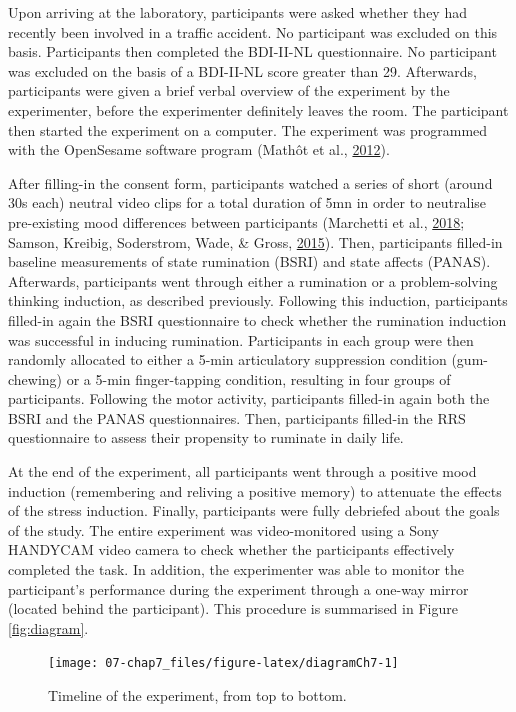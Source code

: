 \documentclass[a4paper,12pt,twoside,openright,oldfontcommands]{memoir}
\begin{document}
Upon arriving at the laboratory, participants were asked whether they had recently been involved in a traffic accident. No participant was excluded on this basis. Participants then completed the BDI-II-NL questionnaire. No participant was excluded on the basis of a BDI-II-NL score greater than 29. Afterwards, participants were given a brief verbal overview of the experiment by the experimenter, before the experimenter definitely leaves the room. The participant then started the experiment on a computer. The experiment was programmed with the OpenSesame software program (Mathôt et al., \protect\hyperlink{ref-mathot_opensesame_2012}{2012}).

After filling-in the consent form, participants watched a series of short (around 30s each) neutral video clips for a total duration of 5mn in order to neutralise pre-existing mood differences between participants (Marchetti et al., \protect\hyperlink{ref-marchetti_brief_2018}{2018}; Samson, Kreibig, Soderstrom, Wade, \& Gross, \protect\hyperlink{ref-samson_eliciting_2015}{2015}). Then, participants filled-in baseline measurements of state rumination (BSRI) and state affects (PANAS). Afterwards, participants went through either a rumination or a problem-solving thinking induction, as described previously. Following this induction, participants filled-in again the BSRI questionnaire to check whether the rumination induction was successful in inducing rumination. Participants in each group were then randomly allocated to either a 5-min articulatory suppression condition (gum-chewing) or a 5-min finger-tapping condition, resulting in four groups of participants. Following the motor activity, participants filled-in again both the BSRI and the PANAS questionnaires. Then, participants filled-in the RRS questionnaire to assess their propensity to ruminate in daily life.

At the end of the experiment, all participants went through a positive mood induction (remembering and reliving a positive memory) to attenuate the effects of the stress induction. Finally, participants were fully debriefed about the goals of the study. The entire experiment was video-monitored using a Sony HANDYCAM video camera to check whether the participants effectively completed the task. In addition, the experimenter was able to monitor the participant's performance during the experiment through a one-way mirror (located behind the participant). This procedure is summarised in Figure \ref{fig:diagram}.

\begin{figure}[H]

{\centering \texttt{[image: 07-chap7\_files/figure-latex/diagramCh7-1]} 

}

\caption{Timeline of the experiment, from top to bottom.}\label{fig:diagramCh7}
\end{figure}
\end{document}
